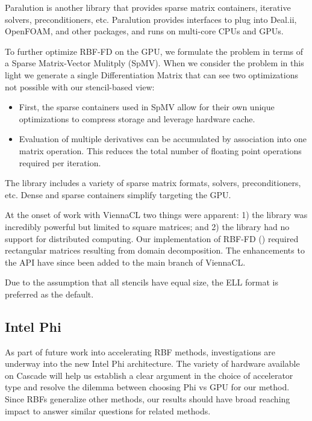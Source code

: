 \documentclass{report}
\begin{document}
Paralution is another library that provides sparse matrix containers, iterative solvers, preconditioners, etc. Paralution provides interfaces to plug into Deal.ii, OpenFOAM, and other packages, and runs on multi-core CPUs and GPUs. 


To further optimize RBF-FD on the GPU, we formulate the problem in terms of a Sparse Matrix-Vector Mulitply (SpMV). When we consider the problem in this light we generate a single Differentiation Matrix that can see two optimizations not possible with our stencil-based view: 
\begin{itemize} 
\item First, the sparse containers used in SpMV allow for their own unique optimizations to compress storage and leverage hardware cache.
\item Evaluation of multiple derivatives can be accumulated by association into one matrix operation. This reduces the total number of floating point operations required per iteration. 
\end{itemize}


The library includes a variety of sparse matrix formats, solvers, preconditioners, etc. Dense and sparse containers simplify targeting the GPU. 

At the onset of work with ViennaCL two things were apparent: 1) the library was incredibly powerful but limited to square matrices; and 2) the library had no support for distributed computing. Our implementation of RBF-FD (\cite{BolligRBFFDGPU}) required rectangular matrices resulting from domain decomposition. The enhancements to the API have since been added to the main branch of ViennaCL. 









Due to the assumption that all stencils have equal size, the ELL format is preferred as the default. 
 





\subsection{Intel Phi} 

As part of future work into accelerating RBF methods, investigations are underway into the new Intel Phi architecture. The variety of hardware available on Cascade will help us establish a clear argument in the choice of accelerator type and resolve the dilemma between choosing Phi vs GPU for our method. Since RBFs generalize other methods, our results should have broad reaching impact to answer similar questions for related methods.
\end{document}
